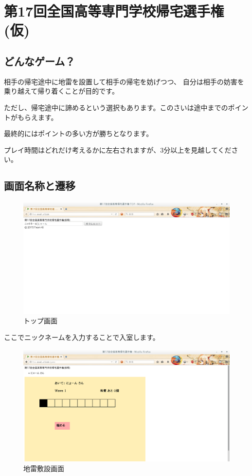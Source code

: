 \section{第17回全国高等専門学校帰宅選手権(仮)}\label{ux7b2c17ux56deux5168ux56fdux9ad8ux7b49ux5c02ux9580ux5b66ux6821ux5e30ux5b85ux9078ux624bux6a29ux4eee}

\subsection{どんなゲーム？}\label{ux3069ux3093ux306aux30b2ux30fcux30e0}

相手の帰宅途中に地雷を設置して相手の帰宅を妨げつつ、
自分は相手の妨害を乗り越えて帰り着くことが目的です。

ただし、帰宅途中に諦めるという選択もあります。このさいは途中までのポイントがもらえます。

最終的にはポイントの多い方が勝ちとなります。

プレイ時間はどれだけ考えるかに左右されますが、3分以上を見越してください。

\subsection{画面名称と遷移}\label{ux753bux9762ux540dux79f0ux3068ux9077ux79fb}

\begin{figure}[htbp]
\centering
\includegraphics{./top.png}
\caption{トップ画面}
\end{figure}

ここでニックネームを入力することで入室します。

\begin{figure}[htbp]
\centering
\includegraphics{./mine.png}
\caption{地雷敷設画面}
\end{figure}

